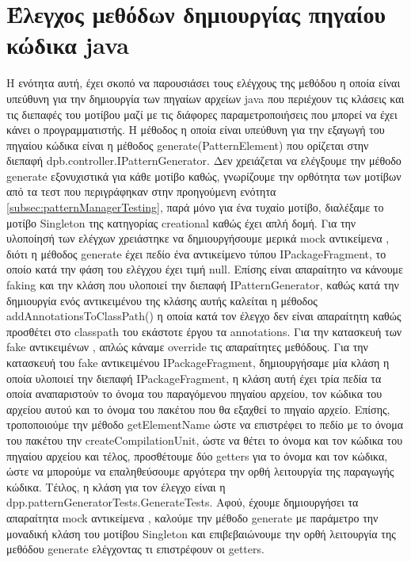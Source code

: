 \section{Έλεγχος μεθόδων δημιουργίας πηγαίου κώδικα java}
\label{sec:patternGeneratorTesting}
Η ενότητα αυτή, έχει σκοπό να παρουσιάσει τους ελέγχους της μεθόδου η οποία είναι υπεύθυνη 
για την δημιουργία των πηγαίων αρχείων java που περιέχουν τις κλάσεις και τις διεπαφές του μοτίβου μαζί με τις 
διάφορες παραμετροποιήσεις που μπορεί να έχει κάνει ο προγραμματιστής. Η μέθοδος η οποία είναι υπεύθυνη για την εξαγωγή 
του πηγαίου κώδικα είναι η μέθοδος generate(PatternElement) που ορίζεται στην διεπαφή dpb.controller.IPatternGenerator. 
Δεν χρειάζεται να ελέγξουμε την μέθοδο generate εξονυχιστικά για κάθε μοτίβο καθώς, γνωρίζουμε την ορθότητα των μοτίβων από τα τεστ που 
περιγράφηκαν στην προηγούμενη ενότητα \ref{subsec:patternManagerTesting}, παρά μόνο για ένα τυχαίο μοτίβο, 
διαλέξαμε το μοτίβο Singleton της κατηγορίας creational καθώς έχει απλή δομή. Για την υλοποίησή των ελέγχων χρειάστηκε να δημιουργήσουμε
μερικά mock αντικείμενα \cite{SWEBOK}, διότι η μέθοδος generate έχει πεδίο ένα αντικείμενο τύπου IPackageFragment, 
το οποίο κατά την φάση του ελέγχου έχει τιμή null. Επίσης είναι απαραίτητο να κάνουμε faking \cite{SWEBOK} και την κλάση που υλοποιεί
την διεπαφή IPatternGenerator, καθώς κατά την δημιουργία ενός αντικειμένου της κλάσης αυτής καλείται η μέθοδος addAnnotationsToClassPath()
η οποία κατά τον έλεγχο δεν είναι απαραίτητη καθώς προσθέτει στο classpath του εκάστοτε έργου τα annotations. 
Για την κατασκευή των fake αντικειμένων \cite{SWEBOK}, απλώς κάναμε override τις απαραίτητες μεθόδους. 
Για την κατασκευή του fake αντικειμένου \cite{SWEBOK} IPackageFragment, δημιουργήσαμε μία κλάση η οποία υλοποιεί την διεπαφή  IPackageFragment,
η κλάση αυτή έχει τρία πεδία τα οποία αναπαριστούν το όνομα του παραγόμενου πηγαίου αρχείου, τον κώδικα του αρχείου αυτού 
και το όνομα του πακέτου που θα εξαχθεί το πηγαίο αρχείο. 
Επίσης, τροποποιούμε την μέθοδο getElementName ώστε να επιστρέφει το πεδίο με το όνομα του πακέτου 
την createCompilationUnit, ώστε να θέτει το όνομα και τον κώδικα του πηγαίου αρχείου 
και τέλος, προσθέτουμε δύο getters για το όνομα και τον κώδικα, ώστε να μπορούμε να επαληθεύσουμε αργότερα την ορθή λειτουργία της παραγωγής κώδικα.
Τέιλος, η κλάση για τον έλεγχο είναι η dpp.patternGeneratorTests.GenerateTests. Αφού, έχουμε δημιουργήσει τα απαραίτητα mock αντικείμενα \cite{SWEBOK}, καλούμε την μέθοδο generate με παράμετρο την 
μοναδική κλάση του μοτίβου Singleton και επιβεβαιώνουμε την ορθή λειτουργία της μεθόδου generate ελέγχοντας τι επιστρέφουν οι getters.
